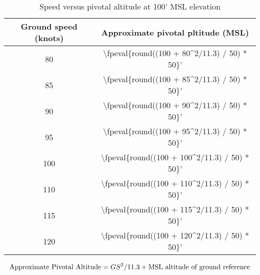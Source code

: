\begin{table}[H]
    \caption{Speed versus pivotal altitude at 100' MSL elevation}

    \begin{center}
        \begin{tabular}{cc}
            \toprule
            \textbf{Ground speed (knots)} & \textbf{Approximate pivotal pltitude (MSL)}         \\
            \midrule
            80                            & \num{\fpeval{round((100 + 80^2/11.3) / 50) * 50}}'  \\
            85                            & \num{\fpeval{round((100 + 85^2/11.3) / 50) * 50}}'  \\
            90                            & \num{\fpeval{round((100 + 90^2/11.3) / 50) * 50}}'  \\
            95                            & \num{\fpeval{round((100 + 95^2/11.3) / 50) * 50}}'  \\
            100                           & \num{\fpeval{round((100 + 100^2/11.3) / 50) * 50}}' \\
            110                           & \num{\fpeval{round((100 + 110^2/11.3) / 50) * 50}}' \\
            115                           & \num{\fpeval{round((100 + 115^2/11.3) / 50) * 50}}' \\
            120                           & \num{\fpeval{round((100 + 120^2/11.3) / 50) * 50}}' \\
            \bottomrule
        \end{tabular}
    \end{center}
\end{table}

\begin{equation}
    \label{eq1}
    \textrm{Approximate Pivotal Altitude} = \\
    GS^2 / 11.3 + \textrm{MSL altitude of ground reference}
\end{equation}
